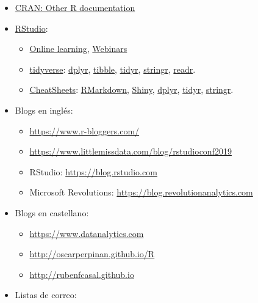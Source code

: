 \documentclass[
]{book}
\theoremstyle{break}
\theoremstyle{definition}
\theoremstyle{definition}
\theoremstyle{definition}
\theoremstyle{remark}
\begin{document}
\begin{itemize}
\item
  \href{https://www.r-project.org/other-docs.html}{CRAN: Other R documentation}
\item
  \href{https://www.rstudio.com}{RStudio}:

  \begin{itemize}
  \item
    \href{https://www.rstudio.com/online-learning}{Online learning},
    \href{https://resources.rstudio.com/webinars}{Webinars}
  \item
    \href{https://www.tidyverse.org/}{tidyverse}:
    \href{https://dplyr.tidyverse.org}{dplyr},
    \href{https://tibble.tidyverse.org}{tibble},
    \href{https://tidyr.tidyverse.org}{tidyr},
    \href{https://stringr.tidyverse.org}{stringr},
    \href{https://readr.tidyverse.org}{readr}.
  \item
    \href{https://resources.rstudio.com/rstudio-cheatsheets}{CheatSheets}:
    \href{https://resources.rstudio.com/rstudio-cheatsheets/rmarkdown-2-0-cheat-sheet}{RMarkdown},
    \href{https://resources.rstudio.com/rstudio-cheatsheets/shiny-cheat-sheet}{Shiny},
    \href{https://github.com/rstudio/cheatsheets/blob/master/data-transformation.pdf}{dplyr},
    \href{https://github.com/rstudio/cheatsheets/blob/master/data-import.pdf}{tidyr},
    \href{https://resources.rstudio.com/rstudio-cheatsheets/stringr-cheat-sheet}{stringr}.
  \end{itemize}
\item
  Blogs en inglés:

  \begin{itemize}
  \item
    \url{https://www.r-bloggers.com/}
  \item
    \url{https://www.littlemissdata.com/blog/rstudioconf2019}
  \item
    RStudio: \url{https://blog.rstudio.com}
  \item
    Microsoft Revolutions: \url{https://blog.revolutionanalytics.com}
  \end{itemize}
\item
  Blogs en castellano:

  \begin{itemize}
  \item
    \url{https://www.datanalytics.com}
  \item
    \url{http://oscarperpinan.github.io/R}
  \item
    \url{http://rubenfcasal.github.io}
  \end{itemize}
\item
  Listas de correo:


\end{itemize}
\end{document}
